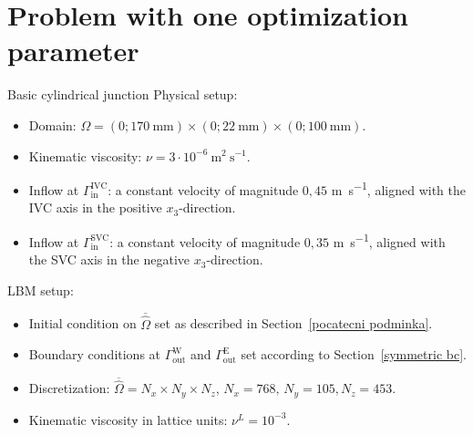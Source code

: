 \section{Problem with one optimization parameter}
\begin{problem}{Basic cylindrical junction}
	\vspace{2mm}
	Physical setup:
	\begin{itemize}
		\item Domain: $ \Omega=(0 ; 170 \mathrm{~mm}) \times(0 ; 22 \mathrm{~mm}) \times(0 ; 100 \mathrm{~mm})$.
		\item Kinematic viscosity: $ \nu=3 \cdot 10^{-6} \mathrm{~m}^{2} \mathrm{~s}^{-1}$.
		\item Inflow at $\Gamma^{\text{IVC}}_{\text{in}}$: a constant velocity of magnitude $0{,}45$ \si{m s^{-1}},  aligned with the IVC axis in the positive $x_3$-direction.
		\item Inflow at $\Gamma^{\text{SVC}}_{\text{in}}$: a constant velocity of magnitude $0{,}35$ \si{m s^{-1}}, aligned with the SVC axis in the negative $x_3$-direction.
	\end{itemize} 
	LBM setup:
	\begin{itemize}
		\item Initial condition on $ \overline{\hat{\Omega}} $ set as described in Section~\ref{pocatecni podminka}.
		\item Boundary conditions at $\Gamma^{\text{W}}_{\text{out}}$ and $\Gamma^{\text{E}}_{\text{out}}$ set according to Section~\ref{symmetric bc}.
		\item Discretization: $\overline{\hat{\Omega}} = N_{x} \times N_{y} \times N_{z}$, $N_{x} = 768, \, N_{y} = 105, N_{z} = 453$.
		\item Kinematic viscosity in lattice units: $\nu^{L} = 10^{-3} $.
	\end{itemize}
	\label{prob:1}
\end{problem}
\newpage
